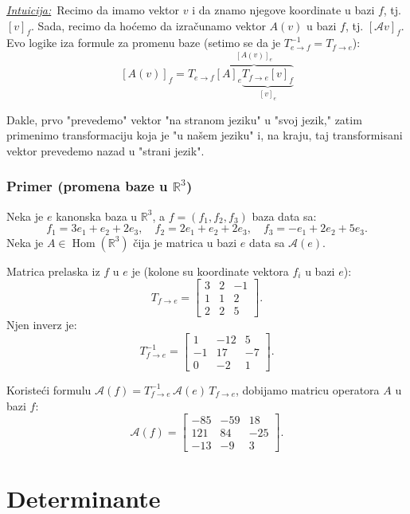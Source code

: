 \documentclass[a4paper,12pt,twoside]{report}
\numberwithin{algorithm}{section}
\newcommand{\intuicija}{\noindent\underline{\textit{Intuicija:}}\ }
\begin{document}
\newpage

\intuicija Recimo da imamo vektor $v$ i da znamo njegove koordinate u bazi $f$, tj. $[v]_f$. Sada, recimo da hoćemo da izračunamo vektor $A(v)$ u bazi $f$, tj.
$[\mathcal{A}v]_f$. Evo logike iza formule za promenu baze (setimo se da je $T_{e \to f}^{-1} = T_{f \to e}$):
{\Large \[ [A(v)]_f = T_{e \to f}  \overbrace{[A]_e \underbrace{T_{f \to e} [v]_f}_{[v]_e}}^{[A(v)]_e} \]}

Dakle, prvo "prevedemo" vektor "na stranom jeziku" u "svoj jezik," zatim primenimo transformaciju koja je "u našem jeziku" i, na kraju, taj transformisani vektor prevedemo nazad u 
"strani jezik".
\vfill
\subsubsection*{Primer (promena baze u $\mathbb{R}^3$)}

Neka je $e$ kanonska baza u $\mathbb{R}^3$, a $f = (f_1, f_2, f_3)$ baza data sa:
\[
f_1 = 3e_1 + e_2 + 2e_3,\quad 
f_2 = 2e_1 + e_2 + 2e_3,\quad 
f_3 = -e_1 + 2e_2 + 5e_3.
\]
Neka je $A \in \operatorname{Hom}(\mathbb{R}^3)$ čija je matrica u bazi $e$ data sa $\mathcal{A}(e)$. 

Matrica prelaska iz $f$ u $e$ je (kolone su koordinate vektora $f_i$ u bazi $e$):
\[
T_{f \to e} = 
\begin{bmatrix}
3 & 2 & -1 \\
1 & 1 & 2 \\
2 & 2 & 5
\end{bmatrix}.
\]
Njen inverz je:
\[
T_{f \to e}^{-1} = 
\begin{bmatrix}
1 & -12 & 5 \\
-1 & 17 & -7 \\
0 & -2 & 1
\end{bmatrix}.
\]

Koristeći formulu $\mathcal{A}(f) = T_{f \to e}^{-1} \, \mathcal{A}(e) \, T_{f \to e}$, dobijamo matricu operatora $A$ u bazi $f$:
\[
\mathcal{A}(f) = 
\begin{bmatrix}
-85 & -59 & 18 \\
121 & 84 & -25 \\
-13 & -9 & 3
\end{bmatrix}.
\]
\vfill

\newpage

\section{Determinante}
\label{determinante}
\end{document}
